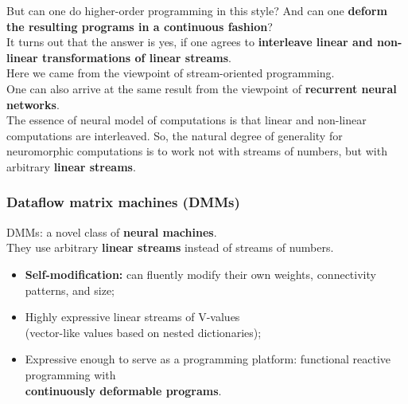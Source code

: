 \documentclass{beamer}
\newcommand{\msmagenta}[1]{{\color{mymagenta} #1}}
\begin{document}
\begin{frame}
   But can one do higher-order programming in this style? And can one {\bf deform the resulting programs
in a continuous fashion}?\\[2ex]

   It turns out that the answer is yes, if one agrees to {\bf interleave linear and non-linear
transformations of linear streams}.\\[2ex]

   Here we came from the viewpoint of stream-oriented programming.\\[2ex]

   One can also arrive at the same result from the viewpoint of {\bf recurrent neural networks}.\\[2ex]

  The essence of neural model of computations is that linear and non-linear computations are interleaved.  So, the natural degree of generality for neuromorphic computations is to work not with streams of numbers, but with arbitrary  
{\bf linear streams}.

  

\end{frame}

\begin{frame}

  \frametitle{\msmagenta{Dataflow matrix machines (DMMs)}}

DMMs: a novel class of {\bf neural machines}.\\[2ex]

They use arbitrary {\bf linear streams} instead of streams of numbers.\\[2ex]


\begin{itemize}

\item {\bf Self-modification:} can fluently modify their own weights, connectivity patterns, and size;\\[2ex]

\item Highly expressive linear streams of V-values\\ (vector-like values based on nested dictionaries);\\[2ex]

\item Expressive enough to serve as a programming platform: functional reactive programming with\\ {\bf continuously deformable programs}.

\end{itemize}

\end{frame}
\end{document}
